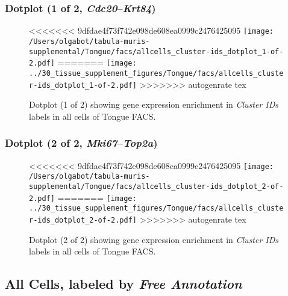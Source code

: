 \clearpage

\subsubsection{Dotplot (1 of 2, \emph{Cdc20}--\emph{Krt84})}
\begin{figure}[h]
\centering
<<<<<<< 9dfdae4f73f742e098de608ea0999c2476425095
\texttt{[image: /Users/olgabot/tabula-muris-supplemental/Tongue/facs/allcells\_cluster-ids\_dotplot\_1-of-2.pdf]}
=======
\texttt{[image: ../30\_tissue\_supplement\_figures/Tongue/facs/allcells\_cluster-ids\_dotplot\_1-of-2.pdf]}
>>>>>>> autogenrate tex

\caption{ Dotplot (1 of 2)  showing gene expression enrichment in \emph{Cluster IDs} labels in all cells of Tongue FACS. }
\end{figure}


\clearpage

\subsubsection{Dotplot (2 of 2, \emph{Mki67}--\emph{Top2a})}
\begin{figure}[h]
\centering
<<<<<<< 9dfdae4f73f742e098de608ea0999c2476425095
\texttt{[image: /Users/olgabot/tabula-muris-supplemental/Tongue/facs/allcells\_cluster-ids\_dotplot\_2-of-2.pdf]}
=======
\texttt{[image: ../30\_tissue\_supplement\_figures/Tongue/facs/allcells\_cluster-ids\_dotplot\_2-of-2.pdf]}
>>>>>>> autogenrate tex

\caption{ Dotplot (2 of 2)  showing gene expression enrichment in \emph{Cluster IDs} labels in all cells of Tongue FACS. }
\end{figure}


\clearpage

\subsection{All Cells, labeled by \emph{Free Annotation}}
